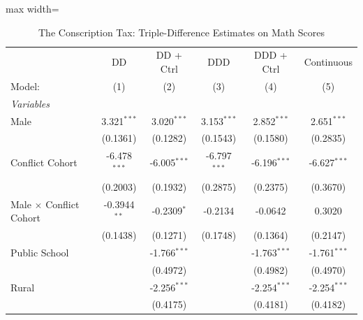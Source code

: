 
\begin{table}[htbp]
   \caption{\label{tab:main_math} The Conscription Tax: Triple-Difference Estimates on Math Scores}
   \centering
   \begin{adjustbox}{max width=\textwidth}
   \begin{tabular}{lccccc}
      \tabularnewline \midrule \midrule
                                                                  & DD             & DD + Ctrl      & DDD            & DDD + Ctrl     & Continuous \\   
      Model:                                                      & (1)            & (2)            & (3)            & (4)            & (5)\\  
      \midrule
      \emph{Variables}\\
      Male                                                        & 3.321$^{***}$  & 3.020$^{***}$  & 3.153$^{***}$  & 2.852$^{***}$  & 2.651$^{***}$\\   
                                                                  & (0.1361)       & (0.1282)       & (0.1543)       & (0.1580)       & (0.2835)\\   
      Conflict Cohort                                             & -6.478$^{***}$ & -6.005$^{***}$ & -6.797$^{***}$ & -6.196$^{***}$ & -6.627$^{***}$\\   
                                                                  & (0.2003)       & (0.1932)       & (0.2875)       & (0.2375)       & (0.3670)\\   
      Male $\times$ Conflict Cohort                               & -0.3944$^{**}$ & -0.2309$^{*}$  & -0.2134        & -0.0642        & 0.3020\\   
                                                                  & (0.1438)       & (0.1271)       & (0.1748)       & (0.1364)       & (0.2147)\\   
      Public School                                               &                & -1.766$^{***}$ &                & -1.763$^{***}$ & -1.761$^{***}$\\   
                                                                  &                & (0.4972)       &                & (0.4982)       & (0.4970)\\   
      Rural                                                       &                & -2.256$^{***}$ &                & -2.254$^{***}$ & -2.254$^{***}$\\   
                                                                  &                & (0.4175)       &                & (0.4181)       & (0.4182)\\   

\end{tabular}
\end{adjustbox}
\end{table}
